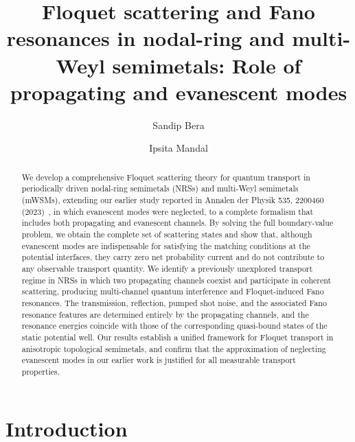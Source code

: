 \documentclass[aps,prb,onecolumn,longbibliography,nofootinbib,citeautoscript,10pt]{revtex4-2}
\begin{document}
	
\title{Floquet scattering and Fano resonances in nodal-ring and multi-Weyl semimetals: Role of propagating and evanescent modes} 

\author{Sandip Bera}

\author{Ipsita Mandal}
	
	
\begin{abstract}
We develop a comprehensive Floquet scattering theory for quantum transport in periodically driven nodal-ring semimetals (NRSs) and multi-Weyl semimetals (mWSMs), extending our earlier study reported in Annalen der Physik 535, 2200460 (2023)~\cite{bera2023}, in which evanescent modes were neglected, to a complete formalism that includes both propagating and evanescent channels. By solving the full boundary-value problem, we obtain the complete set of scattering states and show that, although evanescent modes are indispensable for satisfying the matching conditions at the potential interfaces, they carry zero net probability current and do not contribute to any observable transport quantity. We identify a previously unexplored transport regime in NRSs in which two propagating channels coexist and participate in coherent scattering, producing multi-channel quantum interference and Floquet-induced Fano resonances. The transmission, reflection, pumped shot noise, and the associated Fano resonance features are determined entirely by the propagating channels, and the resonance energies coincide with those of the corresponding quasi-bound states of the static potential well. Our results establish a unified framework for Floquet transport in anisotropic topological semimetals, and confirm that the approximation of neglecting evanescent modes in our earlier work is justified for all measurable transport properties.
\end{abstract}

	
	
\maketitle


\tableofcontents

\section{Introduction}
\label{secintro}
\end{document}
